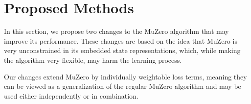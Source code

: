 \section{Proposed Methods}
In this section, we propose two changes to the MuZero algorithm that may improve its performance. These changes are based on the idea that MuZero is very unconstrained in its embedded state representations, which, while making the algorithm very flexible, may harm the learning process.

Our changes extend MuZero by individually weightable loss terms, meaning they can be viewed as a generalization of the regular MuZero algorithm and may be used either independently or in combination.


